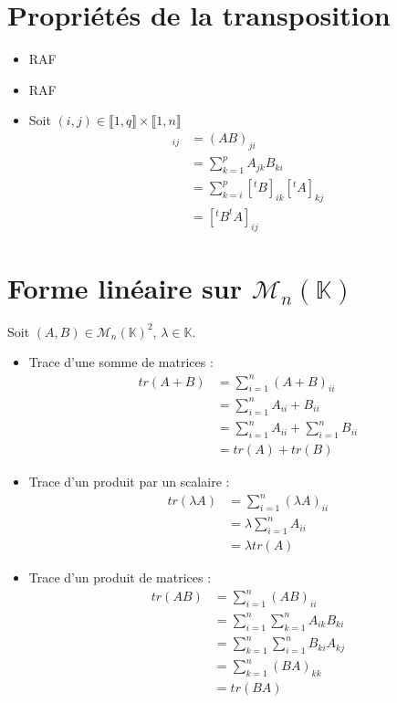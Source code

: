 \documentclass[../main.tex]{subfiles}
\begin{document}
\setcounter{section}{26}
\section{Propriétés de la transposition}
\begin{itemize}
    \item RAF
    \item RAF
    \item Soit $(i, j) \in \llbracket 1, q\rrbracket \times \llbracket 1, n \rrbracket$
    \begin{align*} 
        [^t(AB)]_{ij} &= (AB)_{ji} \\
        &= \sum^p_{k=1} A_{jk}B_{ki} \\
        &= \sum^p_{k=i}[^tB]_{ik}[^tA]_{kj} \\
        &= [^tB ^tA]_{ij}
    \end{align*}
\end{itemize}

\setcounter{section}{30}
\section{Forme linéaire sur $\mathcal{M}_n(\mathbb{K})$}
Soit $(A,B) \in \mathcal{M}_n(\mathbb{K})^2$, $\lambda \in \mathbb{K}$.
\begin{itemize}
\item Trace d'une somme de matrices :
\begin{align*}
    tr(A + B) &= \sum^n_{i=1} (A + B)_{ii} \\
    &= \sum^n_{i=1} A_{ii} + B_{ii} \\
    &= \sum^n_{i=1} A_{ii} + \sum^n_{i=1} B_{ii} \\
    &= tr(A) + tr(B)
\end{align*}

\item Trace d'un produit par un scalaire :
\begin{align*}
    tr(\lambda A) &= \sum^n_{i=1} (\lambda A)_{ii} \\
    &= \lambda \sum^n_{i=1} A_{ii} \\
    &= \lambda tr(A)
\end{align*}

\item Trace d'un produit de matrices :
\begin{align*}
    tr(AB) &= \sum^n_{i=1} (AB)_{ii} \\
    &= \sum^n_{i=1} \sum^n_{k=1} A_{ik}B_{ki} \\
    &= \sum^n_{k=1} \sum^n_{i=1} B_{ki}A_{kj} \\
    &= \sum^n_{k=1} (BA)_{kk} \\
    &= tr(BA)
\end{align*}
\end{itemize}
\end{document}
